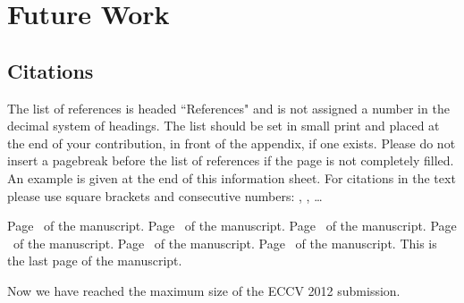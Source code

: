 \documentclass[runningheads]{llncs}
\begin{document}
\section{Future Work}

\subsection{Citations}

The list of references is headed ``References" and is not assigned a
number
in the decimal system of headings. The list should be set in small print
and placed at the end of your contribution, in front of the appendix,
if one exists.
Please do not insert a pagebreak before the list of references if the
page is not completely filled.
An example is given at the
end of this information sheet. For citations in the text please use
square brackets and consecutive numbers: \cite{Alpher02},
\cite{Alpher03}, \cite{Alpher04} \dots





\clearpage\mbox{}Page \thepage\ of the manuscript.
\clearpage\mbox{}Page \thepage\ of the manuscript.
\clearpage\mbox{}Page \thepage\ of the manuscript.
\clearpage\mbox{}Page \thepage\ of the manuscript.
\clearpage\mbox{}Page \thepage\ of the manuscript.
\clearpage\mbox{}Page \thepage\ of the manuscript.
This is the last page of the manuscript.
\par\vfill\par
Now we have reached the maximum size of the ECCV 2012 submission.
\end{document}
